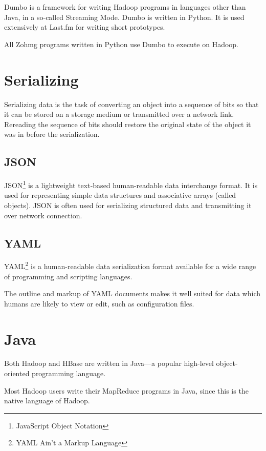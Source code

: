 \documentclass[a4paper,10pt]{book}
\begin{document}
Dumbo is a framework for writing Hadoop programs in languages other than Java, in a so-called Streaming Mode. Dumbo is written in Python. It is used extensively at Last.fm for writing short prototypes.

All Zohmg programs written in Python use Dumbo to execute on Hadoop.



\section{Serializing}

Serializing data is the task of converting an object into a sequence of
bits so that it can be stored on a storage medium or transmitted over a
network link. Rereading the sequence of bits should restore the original
state of the object it was in before the serialization.


\subsection{JSON}

JSON\footnote{JavaScript Object Notation} is a lightweight text-based
human-readable data interchange format. It is used for representing simple
data structures and associative arrays (called objects). JSON is often used
for serializing structured data and transmitting it over network
connection.


\subsection{YAML}

YAML\footnote{YAML Ain't a Markup Language} is a human-readable data
serialization format available for a wide range of programming and
scripting languages.

The outline and markup of YAML documents makes it well suited for data
which humans are likely to view or edit, such as configuration files.



\section{Java}

Both Hadoop and HBase are written in Java---a popular high-level
object-oriented programming language.

Most Hadoop users write their MapReduce programs in Java, since this is the
native language of Hadoop.
\end{document}
